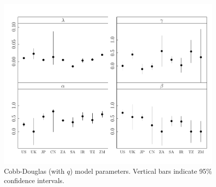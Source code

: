 \documentclass[preprint,authoryear,12pt]{elsarticle}\usepackage{graphicx, color}
\makeatletter
\def\maxwidth{ %
  \ifdim\Gin@nat@width>\linewidth
    \linewidth
  \else
    \Gin@nat@width
  \fi
}
\newenvironment{knitrout}{}{} %
\makeatother
\begin{document}
\begin{knitrout}
\begin{figure}[]
\includegraphics[width=\maxwidth]{figure/CDq_Params_Graph} \caption[Cobb-Douglas (with $q$) model parameters]{Cobb-Douglas (with $q$) model parameters. Vertical bars indicate 95\% confidence intervals.\label{fig:CDq_Params_Graph}}
\end{figure}


\end{knitrout}
\end{document}
